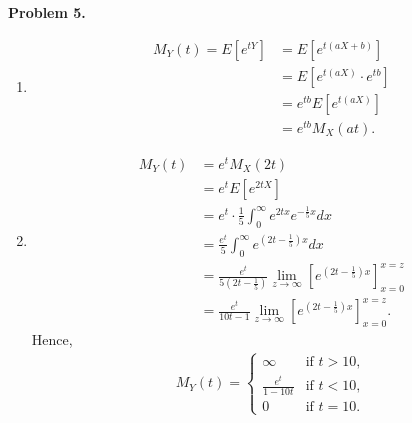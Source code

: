 \documentclass{article}
\begin{document}
\textbf{Problem 5.}
\begin{enumerate}[label={(\alph*)}]
    \item 
    \begin{align}
        M_Y(t)=E[e^{tY}]&=E[e^{t(aX+b)}]\\
        &=E[e^{t(aX)}\cdot e^{tb}]\\
        &=e^{tb}E[e^{t(aX)}]\\
        &=e^{tb}M_X(at).
    \end{align}

    \item 
    \begin{align}
        M_Y(t)&=e^{t}M_X(2t)\\
        &=e^{t}E[e^{2tX}]\\
        &=e^t \cdot\frac{1}{5}\int_{0}^{\infty}e^{2tx}e^{-\frac{1}{5}x}dx\\
        &=\frac{e^t}{5}\int_{0}^{\infty}e^{(2t-\frac{1}{5})x}dx\\
        &=\frac{e^t}{5(2t-\frac{1}{5})}\lim_{z\rightarrow\infty}\left[e^{(2t-\frac{1}{5})x}\right]_{x=0}^{x=z}\\
        &=\frac{e^t}{10t-1}\lim_{z\rightarrow\infty}\left[e^{(2t-\frac{1}{5})x}\right]_{x=0}^{x=z}.
    \end{align}
    Hence,
    \begin{align}
        M_Y(t)=
        \begin{cases}
            \infty &\text{if }t>10, \\
            \frac{e^t}{1-10t} &\text{if }t<10, \\
            0 &\text{if }t=10.
        \end{cases}
    \end{align}
\end{enumerate}
\bigbreak
\end{document}
